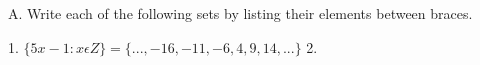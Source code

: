 \documentclass[../main.tex]{subfiles}
\begin{document}
\begin{enumerate}
A. Write each of the following sets by listing their elements between braces.

1. $\{5x-1: x \epsilon Z\} = \{..., -16, -11, -6, 4, 9, 14,...\}$
2. 
\end{enumerate}
\end{document}
